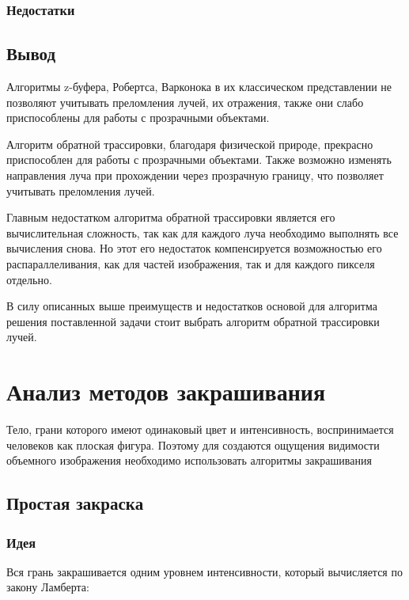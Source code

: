       \subsubsection{Недостатки}
      
    \subsection{Вывод}
    
      Алгоритмы z-буфера, Робертса, Варконока в их классическом представлении не позволяют учитывать преломления лучей, их отражения, также они слабо приспособлены для работы с прозрачными объектами.

      Алгоритм обратной трассировки, благодаря физической природе, прекрасно приспособлен для работы с прозрачными объектами. Также возможно изменять направления луча при прохождении через прозрачную границу, что позволяет учитывать преломления лучей.

      Главным недостатком алгоритма обратной трассировки является его вычислительная сложность, так как для каждого луча необходимо выполнять все вычисления снова. Но этот его недостаток компенсируется возможностью его распараллеливания, как для частей изображения, так и для каждого пикселя отдельно.

      В силу описанных выше преимуществ и недостатков основой для алгоритма решения поставленной задачи стоит выбрать алгоритм обратной трассировки лучей.

  \section{Анализ методов закрашивания}
  
    Тело, грани которого имеют одинаковый цвет и интенсивность, воспринимается человеков как плоская фигура. Поэтому для создаются ощущения видимости объемного изображения необходимо использовать алгоритмы закрашивания
    
    \subsection{Простая закраска}
      
      \subsubsection{Идея}
      
        Вся грань закрашивается одним уровнем интенсивности, который вычисляется по закону Ламберта:
        

